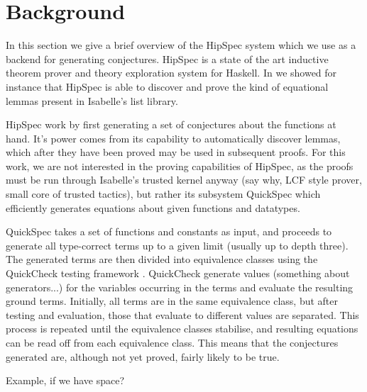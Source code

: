 \section{Background}
\label{sec:background}

In this section we give a brief overview of the HipSpec system which we use as a backend for generating conjectures. HipSpec is a state of the art inductive theorem prover and theory exploration system for Haskell. In \cite{hipspecCADE} we showed for instance that HipSpec is able to discover and prove the kind of equational lemmas present in Isabelle's list library.

HipSpec work by first generating a set of conjectures about the functions at hand.
It's power comes from its capability to automatically discover lemmas, which after they have been proved may be used in subsequent proofs. For this work, we are not interested in the proving capabilities of HipSpec, as the proofs must be run through Isabelle's trusted kernel anyway (say why, LCF style prover, small core of trusted tactics), but rather its subsystem QuickSpec \cite{quickspec} which efficiently generates equations about given functions and datatypes. 

QuickSpec takes a set of functions and constants as input, and proceeds to generate all type-correct terms up to a given limit (usually up to depth three). The generated terms are then divided into equivalence classes using the QuickCheck testing framework \cite{quickcheck}. QuickCheck generate values (something about generators...) for the variables occurring in the terms and evaluate the resulting ground terms.  Initially, all terms are in the same equivalence class, but after testing and evaluation, those that evaluate to different values are separated. This process is repeated until the equivalence classes stabilise, and resulting equations can be read off from each equivalence class. This means that the conjectures generated are, although not yet proved, fairly likely to be true.

Example, if we have space? 
 